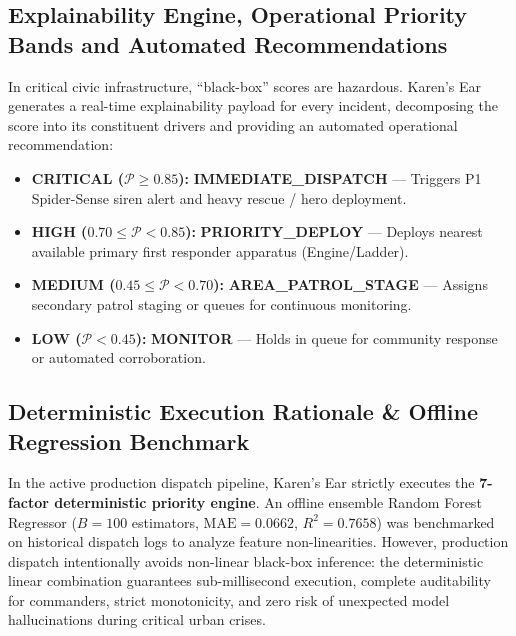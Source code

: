 \documentclass[10pt,a4paper]{article}
\begin{document}
\subsection{Explainability Engine, Operational Priority Bands and Automated Recommendations}
In critical civic infrastructure, ``black-box'' scores are hazardous. Karen's Ear generates a real-time explainability payload for every incident, decomposing the score into its constituent drivers and providing an automated operational recommendation:
\begin{itemize}
  \item \textbf{CRITICAL ($\mathcal{P} \ge 0.85$):} \textbf{IMMEDIATE\_DISPATCH} --- Triggers P1 Spider-Sense siren alert and heavy rescue / hero deployment.
  \item \textbf{HIGH ($0.70 \le \mathcal{P} < 0.85$):} \textbf{PRIORITY\_DEPLOY} --- Deploys nearest available primary first responder apparatus (Engine/Ladder).
  \item \textbf{MEDIUM ($0.45 \le \mathcal{P} < 0.70$):} \textbf{AREA\_PATROL\_STAGE} --- Assigns secondary patrol staging or queues for continuous monitoring.
  \item \textbf{LOW ($\mathcal{P} < 0.45$):} \textbf{MONITOR} --- Holds in queue for community response or automated corroboration.
\end{itemize}

\subsection{Deterministic Execution Rationale \& Offline Regression Benchmark}
In the active production dispatch pipeline, Karen's Ear strictly executes the \textbf{7-factor deterministic priority engine}. An offline ensemble Random Forest Regressor ($B=100$ estimators, $\text{MAE} = 0.0662$, $R^2 = 0.7658$) was benchmarked on historical dispatch logs to analyze feature non-linearities. However, production dispatch intentionally avoids non-linear black-box inference: the deterministic linear combination guarantees sub-millisecond execution, complete auditability for commanders, strict monotonicity, and zero risk of unexpected model hallucinations during critical urban crises.
\end{document}

